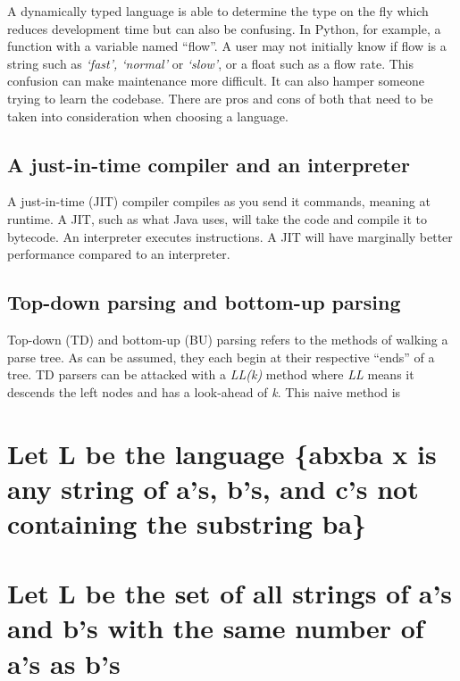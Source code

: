 \documentclass{article}
\begin{document}
A dynamically typed language is able to determine the type on the fly which reduces development time but can also be confusing. In Python, for example, a function with a variable named ``flow''. A user may not initially know if flow is a string such as \textit{`fast', `normal'} or \textit{`slow'}, or a float such as a flow rate. This confusion can make maintenance more difficult. It can also hamper someone trying to learn the codebase. There are pros and cons of both that need to be taken into consideration when choosing a language.

\subsection{A just-in-time compiler and an interpreter}
A just-in-time (JIT) compiler compiles as you send it commands, meaning at runtime. A JIT, such as what Java uses, will take the code and compile it to bytecode. An interpreter executes instructions. A JIT will have marginally better performance compared to an interpreter.

\subsection{Top-down parsing and bottom-up parsing}
Top-down (TD) and bottom-up (BU) parsing refers to the methods of walking a parse tree. As can be assumed, they each begin at their respective ``ends'' of a tree. TD parsers can be attacked with a \textit{LL(k)} method where \textit{LL} means it descends the left nodes and has a look-ahead of \textit{k}. This naive method is 

\section{Let L be the language \{abxba \mid{} x is any string of a's, b's, and c's not containing the substring ba\}}

\section{Let L be the set of all strings of a's and b's with the same number of a's as b's}
\end{document}
